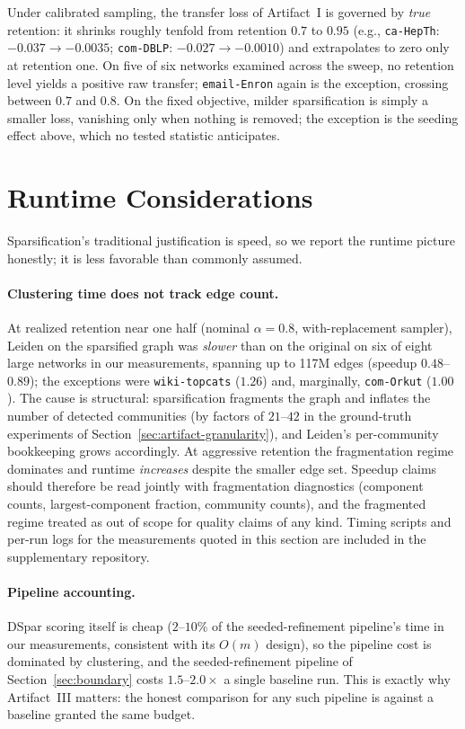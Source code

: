 \documentclass[10pt,journal,compsoc]{IEEEtran}
\begin{document}
Under calibrated sampling, the transfer loss of Artifact~I is governed by \emph{true} retention: it shrinks roughly tenfold from retention $0.7$ to $0.95$ (e.g., \texttt{ca-HepTh}: $-0.037 \to -0.0035$; \texttt{com-DBLP}: $-0.027 \to -0.0010$) and extrapolates to zero only at retention one.
On five of six networks examined across the sweep, no retention level yields a positive raw transfer; \texttt{email-Enron} again is the exception, crossing between $0.7$ and $0.8$.
On the fixed objective, milder sparsification is simply a smaller loss, vanishing only when nothing is removed; the exception is the seeding effect above, which no tested statistic anticipates.


\section{Runtime Considerations}
\label{sec:runtime}

Sparsification's traditional justification is speed, so we report the runtime picture honestly; it is less favorable than commonly assumed.

\paragraph{Clustering time does not track edge count.}
At realized retention near one half (nominal $\alpha = 0.8$, with-replacement sampler), Leiden on the sparsified graph was \emph{slower} than on the original on six of eight large networks in our measurements, spanning up to 117M edges (speedup $0.48$--$0.89$); the exceptions were \texttt{wiki-topcats} ($1.26$) and, marginally, \texttt{com-Orkut} ($1.00$).
The cause is structural: sparsification fragments the graph and inflates the number of detected communities (by factors of $21$--$42$ in the ground-truth experiments of Section~\ref{sec:artifact-granularity}), and Leiden's per-community bookkeeping grows accordingly.
At aggressive retention the fragmentation regime dominates and runtime \emph{increases} despite the smaller edge set.
Speedup claims should therefore be read jointly with fragmentation diagnostics (component counts, largest-component fraction, community counts), and the fragmented regime treated as out of scope for quality claims of any kind. Timing scripts and per-run logs for the measurements quoted in this section are included in the supplementary repository.

\paragraph{Pipeline accounting.}
DSpar scoring itself is cheap ($2$--$10\%$ of the seeded-refinement pipeline's time in our measurements, consistent with its $O(m)$ design), so the pipeline cost is dominated by clustering, and the seeded-refinement pipeline of Section~\ref{sec:boundary} costs $1.5$--$2.0\times$ a single baseline run.
This is exactly why Artifact~III matters: the honest comparison for any such pipeline is against a baseline granted the same budget.
\end{document}
